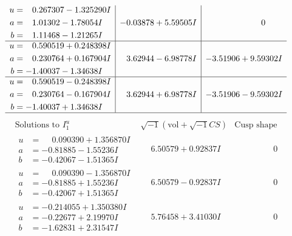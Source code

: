 \documentclass[1p]{elsarticle_modified}
\theoremstyle{definition}
\newcommand{\I}{\sqrt{-1}}
\begin{document}
$$\begin{array}{c|c|c}
\begin{aligned}
u &= \phantom{-}0.267307 - 1.325290 I \\
a &= \phantom{-}1.01302 - 1.78054 I \\
b &= \phantom{-}1.11468 - 1.21265 I\end{aligned}
 & -0.03878 + 5.59505 I & \phantom{-0.000000 } 0 \\ \hline\begin{aligned}
u &= \phantom{-}0.590519 + 0.248398 I \\
a &= \phantom{-}0.230764 + 0.167904 I \\
b &= -1.40037 - 1.34638 I\end{aligned}
 & \phantom{-}3.62944 - 6.98778 I & -3.51906 + 9.59302 I \\ \hline\begin{aligned}
u &= \phantom{-}0.590519 - 0.248398 I \\
a &= \phantom{-}0.230764 - 0.167904 I \\
b &= -1.40037 + 1.34638 I\end{aligned}
 & \phantom{-}3.62944 + 6.98778 I & -3.51906 - 9.59302 I\\
 \hline 
 \end{array}$$\newpage$$\begin{array}{c|c|c}  
\text{Solutions to }I^u_{1}& \I (\text{vol} + \sqrt{-1}CS) & \text{Cusp shape}\\
 \hline 
\begin{aligned}
u &= \phantom{-}0.090390 + 1.356870 I \\
a &= -0.81885 - 1.55236 I \\
b &= -0.42067 - 1.51365 I\end{aligned}
 & \phantom{-}6.50579 + 0.92837 I & \phantom{-0.000000 } 0 \\ \hline\begin{aligned}
u &= \phantom{-}0.090390 - 1.356870 I \\
a &= -0.81885 + 1.55236 I \\
b &= -0.42067 + 1.51365 I\end{aligned}
 & \phantom{-}6.50579 - 0.92837 I & \phantom{-0.000000 } 0 \\ \hline\begin{aligned}
u &= -0.214055 + 1.350380 I \\
a &= -0.22677 + 2.19970 I \\
b &= -1.62831 + 2.31547 I\end{aligned}
 & \phantom{-}5.76458 + 3.41030 I & \phantom{-0.000000 } 0 \\ \hline\begin{aligned}

\end{aligned}
\end{array}$$
\end{document}
